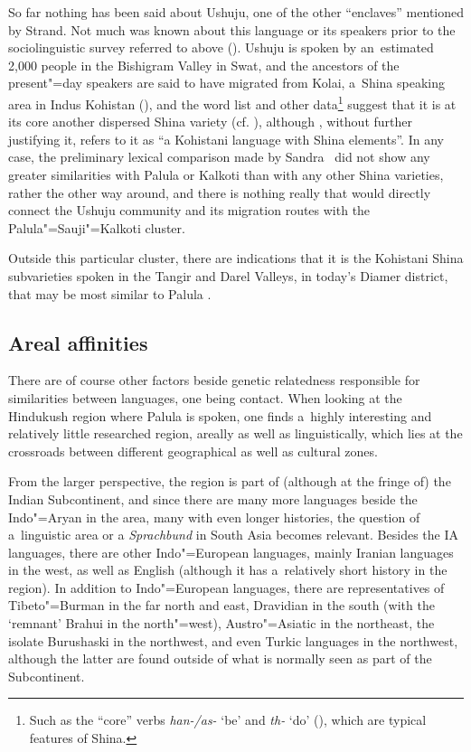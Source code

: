 So far nothing has been said about Ushuju, one of the other ``enclaves'' mentioned by Strand. Not much was known about this language or its speakers prior to the sociolinguistic survey referred to above (\citealt{decker1992}). Ushuju is spoken by an~estimated 2,000 people in the Bishigram Valley in Swat, and the ancestors of the present"=day speakers are said to have migrated from Kolai, a~Shina speaking area in Indus Kohistan (\citealt[69]{decker1992}), and the word list and other data\footnote{Such as the ``core'' verbs \textit{han-/as-} `be' and \textit{th-} `do' (\citealt[ 71--72, 199--203]{decker1992}), which are typical features of Shina.} suggest that it is at its core another dispersed Shina variety (cf. \citealt[255]{strand2001}), although \citet[9]{zoller2005}, without further justifying it, refers to it as ``a Kohistani language with Shina elements''. In any case, the preliminary lexical comparison made by Sandra~\citet[70]{decker1992} did not show any greater similarities with Palula or Kalkoti than with any other Shina varieties, rather the other way around, and there is nothing really that would directly connect the Ushuju community and its migration routes with the Palula"=Sauji"=Kalkoti cluster.


Outside this particular cluster, there are indications that it is the Kohistani Shina subvarieties spoken in the Tangir and Darel Valleys, in today's Diamer district, that may be most similar to Palula \citep[142--143]{radloff1992}. 


\subsection{Areal affinities}
\label{subsec:1-3-2}

There are of course other factors beside genetic relatedness responsible for similarities between languages, one being contact. When looking at the Hindukush region where Palula is spoken, one finds a~highly interesting and relatively little researched region, areally as well as linguistically, which lies at the crossroads between different geographical as well as cultural zones. 


From the larger perspective, the region is part of (although at the fringe of) the Indian Subcontinent, and since there are many more languages beside the Indo"=Aryan in the area, many with even longer histories, the question of a~linguistic area or a \textit{Sprachbund} in South Asia becomes relevant. Besides the IA languages, there are other Indo"=European languages, mainly Iranian languages in the west, as well as English (although it has a~relatively short history in the region). In addition to Indo"=European languages, there are representatives of Tibeto"=Burman in the far north and east, Dravidian in the south (with the `remnant' Brahui in the north"=west), Austro"=Asiatic in the northeast, the isolate Burushaski in the northwest, and even Turkic languages in the northwest, although the latter are found outside of what is normally seen as part of the Subcontinent. 


